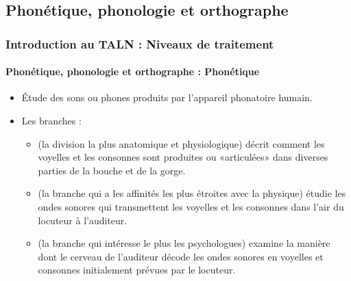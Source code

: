 \documentclass[xcolor=table]{beamer}
\begin{document}
\subsection{Phonétique, phonologie et orthographe}

\begin{frame}
\frametitle{Introduction au TALN : Niveaux de traitement}
\framesubtitle{Phonétique, phonologie et orthographe : Phonétique}

\begin{itemize}
	\item Étude des sons ou phones produits par l'appareil phonatoire humain.
	\item Les branches :
	\begin{itemize}
		\item {} (la division la plus anatomique et physiologique) décrit comment les voyelles et les consonnes sont produites ou «articulées» dans diverses parties de la bouche et de la gorge.
		\item {} (la branche qui a les affinités les plus étroites avec la physique) étudie les ondes sonores qui transmettent les voyelles et les consonnes dans l'air du locuteur à l'auditeur.
		\item {} (la branche qui intéresse le plus les psychologues) examine la manière dont le cerveau de l'auditeur décode les ondes sonores en voyelles et consonnes initialement prévues par le locuteur.
	\end{itemize}
\end{itemize}

\end{frame}
\end{document}
